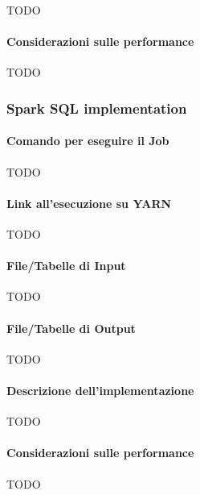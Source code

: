   TODO

  \paragraph{Considerazioni sulle performance}\label{par:job2:mapreduce:performance}

  TODO

  \subsubsection{Spark SQL implementation}\label{subsub:job2:spark}

  \paragraph{Comando per eseguire il Job}\label{par:job2:spark:cmd}

  TODO

  \paragraph{Link all'esecuzione su YARN}\label{par:job2:spark:yarn}

  TODO

  \paragraph{File/Tabelle di Input}\label{par:job2:spark:input}

  TODO

  \paragraph{File/Tabelle di Output}\label{par:job2:spark:output}

  TODO

  \paragraph{Descrizione dell'implementazione}\label{par:job2:spark:implementation}

  TODO

  \paragraph{Considerazioni sulle performance}\label{par:job2:spark:performance}

  TODO
